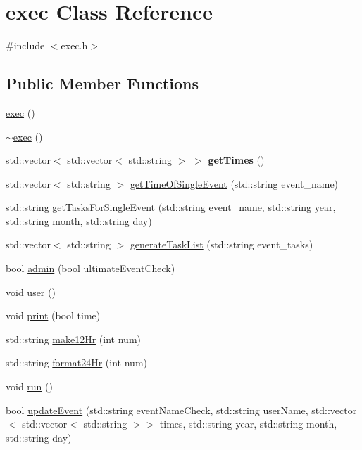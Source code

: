 \hypertarget{classexec}{}\section{exec Class Reference}
\label{classexec}


{\ttfamily \#include $<$exec.\+h$>$}

\subsection*{Public Member Functions}
\begin{DoxyCompactItemize}
\item 
\hyperlink{classexec_a2fac94db8f997a01a590c01478662339}{exec} ()
\item 
\hyperlink{classexec_a663a64f17c5431dc01a829f5633e4f56}{$\sim$exec} ()
\item 
\mbox{\label{classexec_a4ca78729a8eabc233fd936948c85565e}} 
std\+::vector$<$ std\+::vector$<$ std\+::string $>$ $>$ {\bfseries get\+Times} ()
\item 
std\+::vector$<$ std\+::string $>$ \hyperlink{classexec_aa81946a7084e58b434cbbb3f41d646af}{get\+Time\+Of\+Single\+Event} (std\+::string event\+\_\+name)
\item 
std\+::string \hyperlink{classexec_a82e4d3616bf5ef3790b343de9f255548}{get\+Tasks\+For\+Single\+Event} (std\+::string event\+\_\+name, std\+::string year, std\+::string month, std\+::string day)
\item 
std\+::vector$<$ std\+::string $>$ \hyperlink{classexec_a056e0f55ae4c4661f7485fe8fc221210}{generate\+Task\+List} (std\+::string event\+\_\+tasks)
\item 
bool \hyperlink{classexec_ab114315e1bb0daff8f96dc03e7c88392}{admin} (bool ultimate\+Event\+Check)
\item 
void \hyperlink{classexec_a924407f4d277807e949aa9e97470f536}{user} ()
\item 
void \hyperlink{classexec_a4cf771a565711689023aa75141f82c52}{print} (bool time)
\item 
std\+::string \hyperlink{classexec_ade14fc20cd40b2d5e3e8e5abbda382d4}{make12\+Hr} (int num)
\item 
std\+::string \hyperlink{classexec_a24a4ca6c8f63a73ed38ddc8e9d015c46}{format24\+Hr} (int num)
\item 
void \hyperlink{classexec_aad3ea9a2cd99fc28471062719b85b1f6}{run} ()
\item 
bool \hyperlink{classexec_a53711d45518e4b3b690db15f057c1452}{update\+Event} (std\+::string event\+Name\+Check, std\+::string user\+Name, std\+::vector$<$ std\+::vector$<$ std\+::string $>$$>$ times, std\+::string year, std\+::string month, std\+::string day)
$$
\end{DoxyCompactItemize}
